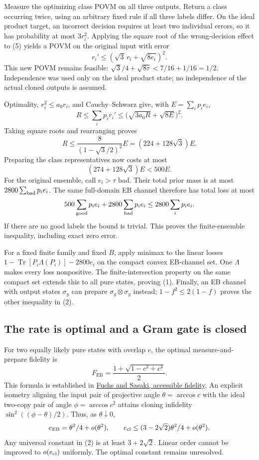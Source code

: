 \documentclass[11pt]{article}
\newcommand{\Tr}{\operatorname{Tr}}
\newcommand{\EB}{\operatorname{EB}}
\begin{document}
Measure the optimizing class POVM on all three outputs. Return a class occurring twice, using an arbitrary fixed rule if all three labels differ. On the ideal product target, an incorrect decision requires at least two individual errors, so it has probability at most $3r_i^2$. Applying the square root of the wrong-decision effect to (5) yields a POVM on the original input with error
\[
r_i'\le(\sqrt3\,r_i+\sqrt{8e_i})^2.\tag{6}
\]
This new POVM remains feasible: $\sqrt3/4+\sqrt{8\tau}<7/16+1/16=1/2$. Independence was used only on the ideal product state; no independence of the actual cloned outputs is assumed.

Optimality, $r_i^2\le a_0r_i$, and Cauchy--Schwarz give, with $E=\sum_i p_i e_i$,
\[
R\le\sum_i p_i r_i'
\le\bigl(\sqrt{3a_0R}+\sqrt{8E}\bigr)^2.
\]
Taking square roots and rearranging proves
\[
R\le\frac8{(1-\sqrt3/2)^2}E=(224+128\sqrt3)E.\tag{7}
\]
Preparing the class representatives now costs at most
\[
(274+128\sqrt3)E<500E.
\]
For the original ensemble, call $e_i>\tau$ bad. Their total prior mass is at most $2800\sum_{\rm bad}p_i e_i$. The same full-domain EB channel therefore has total loss at most
\[
500\sum_{\rm good}p_i e_i+2800\sum_{\rm bad}p_i e_i
\le2800\sum_i p_i e_i.
\]
If there are no good labels the bound is trivial. This proves the finite-ensemble inequality, including exact zero error.

For a fixed finite family and fixed $B$, apply minimax to the linear losses
$1-\Tr[P_i\Lambda(P_i)]-2800e_i$ on the compact convex EB-channel set. One $\Lambda$ makes every loss nonpositive. The finite-intersection property on the same compact set extends this to all pure states, proving (1). Finally, an EB channel with output states $\sigma_y$ can prepare $\sigma_y\otimes\sigma_y$ instead; $1-f^2\le2(1-f)$ proves the other inequality in (2).

\subsection{The rate is optimal and a Gram gate is closed}

For two equally likely pure states with overlap $c$, the optimal measure-and-prepare fidelity is
\[
F_{\EB}=\frac{1+\sqrt{1-c^2+c^4}}2.
\]
This formula is established in \href{https://arxiv.org/abs/quant-ph/0302092}{Fuchs and Sasaki, accessible fidelity}. An explicit isometry aligning the input pair of projective angle $\theta=\arccos c$ with the ideal two-copy pair of angle $\phi=\arccos c^2$ attains cloning infidelity $\sin^2((\phi-\theta)/2)$. Thus, as $\theta\downarrow0$,
\[
e_{\EB}=\theta^2/4+o(\theta^2),\qquad
e_{\rm cl}\le(3-2\sqrt2)\theta^2/4+o(\theta^2).
\]
Any universal constant in (2) is at least $3+2\sqrt2$. Linear order cannot be improved to $o(e_{\rm cl})$ uniformly. The optimal constant remains unresolved.
\end{document}
